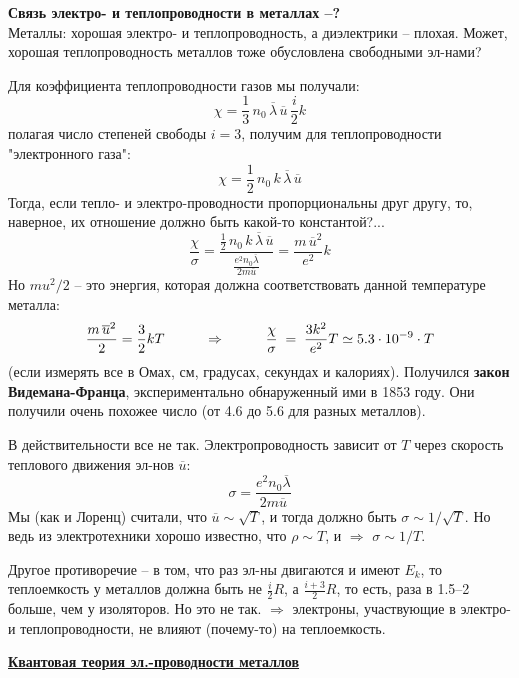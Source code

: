 \documentclass[12pt,epsfig,color,russian]{article}
\begin{document}
{\bf\Large Связь электро- и теплопроводности в металлах --?}\\[2mm]
Металлы: хорошая электро- и теплопроводность, а диэлектрики -- плохая. Может, хорошая тепло\-про\-вод\-ность металлов тоже обусловлена свободными эл-нами?

Для коэффициента теплопроводности газов мы получали:
 \begin{displaymath}
\chi =\frac13\,n_0\,\overline{\lambda}\,\overline{u}\,\frac{i}2k
 \end{displaymath}
полагая число степеней свободы $i=3$, получим для теплопроводности "электронного газа":
 \begin{displaymath}
\chi =\frac12\,n_0\,k\,\overline{\lambda}\,\overline{u}
 \end{displaymath}
Тогда, если тепло- и электро-проводности пропорциональны друг другу, то, наверное, их отношение должно быть какой-то константой?...
 \begin{displaymath}
\frac{\chi}{\sigma} =\frac{\frac12\,n_0\,k\,\overline{\lambda}\,\overline{u}}{\frac{e^2n_0\overline{\lambda}}{2m\overline{u}}}=
\frac{m\,\overline{u}^2}{e^2}k
 \end{displaymath}
 Но $mu^2/2$ -- это энергия, которая должна соответствовать данной температуре металла:
 \begin{displaymath}
\frac{m\,\overline{u}^2}2=\frac32kT\hspace{10mm}\Rightarrow\hspace{10mm}
\frac{\chi}{\sigma}\;=\; \frac{3k^2}{e^2}T \simeq 5.3\cdot10^{-9}\cdot T
 \end{displaymath}
(если измерять все в Омах, см, градусах, секундах и калориях). Получился {\bf закон Видемана-Франца}, экспериментально обнаруженный ими в 1853 году. Они получили очень похожее число (от 4.6 до 5.6 для разных металлов).

В действительности все не так.  Электропроводность зависит от  $T$ через скорость теплового движения эл-нов $\overline{u}$:
 \begin{displaymath}
\sigma= \frac{e^2n_0\overline{\lambda}}{2m\overline{u}}
 \end{displaymath}
 Мы (как и Лоренц) считали, что $\overline{u}\sim \sqrt{T}$, и тогда должно быть $\sigma\sim1/\sqrt{T}$. Но ведь из электротехники хорошо известно, что $\rho\sim T$, и $\Rightarrow$ $\sigma\sim1/T$.

Другое противоречие -- в том, что раз эл-ны двигаются и имеют $E_k$, то теплоемкость у металлов должна быть не $\frac{i}{2}R$, а $\frac{i+3}{2}R$, то есть, раза в 1.5--2 больше, чем у изоляторов. Но это не так.  $\Rightarrow$ электроны, участвующие в электро- и теплопроводности, не влияют (почему-то) на теплоемкость.\\[5mm]
 \centerline{\underline{\huge\bf Квантовая теория эл.-проводности металлов}}\vspace{5mm}
\end{document}
